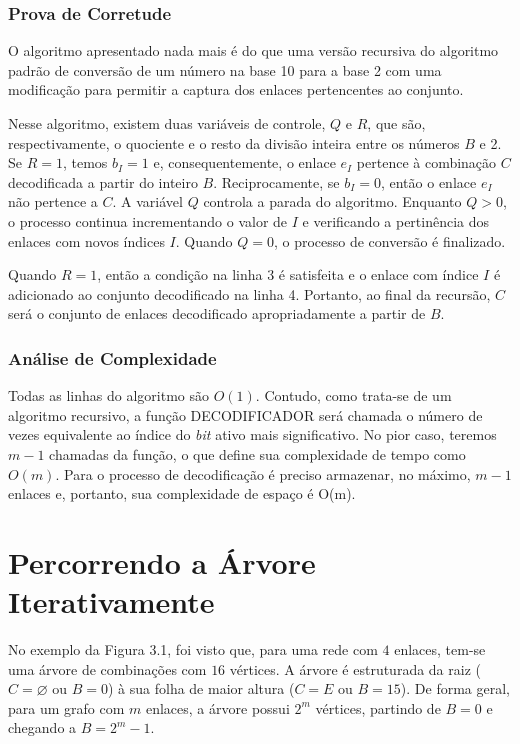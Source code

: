 \subsubsection{Prova de Corretude}

O algoritmo apresentado nada mais é do que uma versão recursiva do algoritmo padrão de conversão de um número na base 10 para a base 2 com uma modificação para permitir a captura dos enlaces pertencentes ao conjunto.

Nesse algoritmo, existem duas variáveis de controle, $Q$ e $R$, que são, respectivamente, o quociente e o resto da divisão inteira entre os números $B$ e 2. Se $R=1$, temos $b_I=1$ e, consequentemente, o enlace $e_I$ pertence à combinação $C$ decodificada a partir do inteiro $B$. Reciprocamente, se $b_I=0$, então o enlace $e_I$ não pertence a $C$. A variável $Q$ controla a parada do algoritmo. Enquanto $Q>0$, o processo continua incrementando o valor de $I$ e verificando a pertinência dos enlaces com novos índices $I$. Quando $Q=0$, o processo de conversão é finalizado.

Quando $R=1$, então a condição na linha 3 é satisfeita e o enlace com índice $I$ é adicionado ao conjunto decodificado na linha 4. Portanto, ao final da recursão, $C$ será o conjunto de enlaces decodificado apropriadamente a partir de $B$.

\subsubsection{Análise de Complexidade}

Todas as linhas do algoritmo são $O(1)$. Contudo, como trata-se de um algoritmo recursivo, a função DECODIFICADOR será chamada o número de vezes equivalente ao índice do {\it bit} ativo mais significativo. No pior caso, teremos $m-1$ chamadas da função, o que define sua complexidade de tempo como $O(m)$. Para o processo de decodificação é preciso armazenar, no máximo, $m-1$ enlaces e, portanto, sua complexidade de espaço é O(m).

\section{Percorrendo a Árvore Iterativamente}
\label{section:busca-iterativa}

No exemplo da Figura 3.1, foi visto que, para uma rede com $4$ enlaces, tem-se uma árvore de combinações com $16$ vértices. A árvore é estruturada da raiz ($C=\varnothing$ ou $B=0$) à sua folha de maior altura ($C=E$ ou $B=15$). De forma geral, para um grafo com $m$ enlaces, a árvore possui $2^m$ vértices, partindo de $B=0$ e chegando a $B=2^m-1$.

